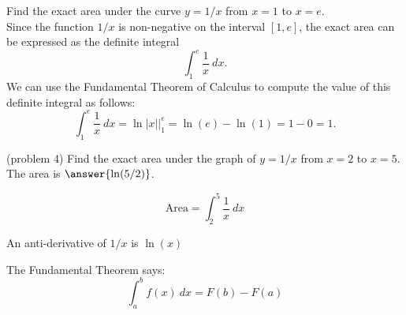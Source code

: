 \documentclass[handout]{ximera}
\begin{document}
\begin{example}[example 4]
Find the exact area under the curve $y = 1/x$ from $x=1$ to $x= e$.\\
Since the function $1/x$ is non-negative on the interval $[1, e]$, the exact area can be expressed as the definite integral
\[\int_1^{e} \frac{1}{x} \ dx.\]
We can use the Fundamental Theorem of Calculus to compute the value of this definite integral as follows:
\[
\int_1^e \frac{1}{x} \ dx = \ln|x| \Big|_1^e = \ln(e) - \ln(1)= 1- 0 = 1.
\]


\begin{image}
\end{image}

\end{example}



\begin{problem}(problem 4)
Find the exact area under the graph of $y = 1/x$ from $x = 2$ to $x = 5$.\\
The area is $\answer{\ln(5/2)}$.
 \begin{hint}
  \[
  \text{Area} = \int_2^{5} \frac{1}{x} \ dx
  \]
  \end{hint}
    \begin{hint}
      An anti-derivative of $1/x$ is $\ln(x)$
    \end{hint}
    \begin{hint}
      The Fundamental Theorem says:
      \[
      \int_a^b f(x) \ dx = F(b) - F(a)
      \]
    \end{hint}    
		
		
\end{problem}
\end{document}
